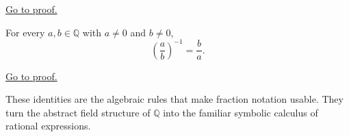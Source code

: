 \begin{remark*}[Proof]
\hyperref[prf:rational-fraction-negation]{Go to proof.}
\end{remark*}

\begin{theorem}
\label{thm:rational-fraction-reciprocal}
For every $a,b\in\mathbb{Q}$ with $a\neq 0$ and $b\neq 0$,
\[
\left(\frac{a}{b}\right)^{-1}=\frac{b}{a}.
\]
\end{theorem}

\begin{remark*}[Proof]
\hyperref[prf:rational-fraction-reciprocal]{Go to proof.}
\end{remark*}

\begin{remark}
These identities are the algebraic rules that make fraction notation usable.
They turn the abstract field structure of $\mathbb{Q}$ into the familiar
symbolic calculus of rational expressions.
\end{remark}
